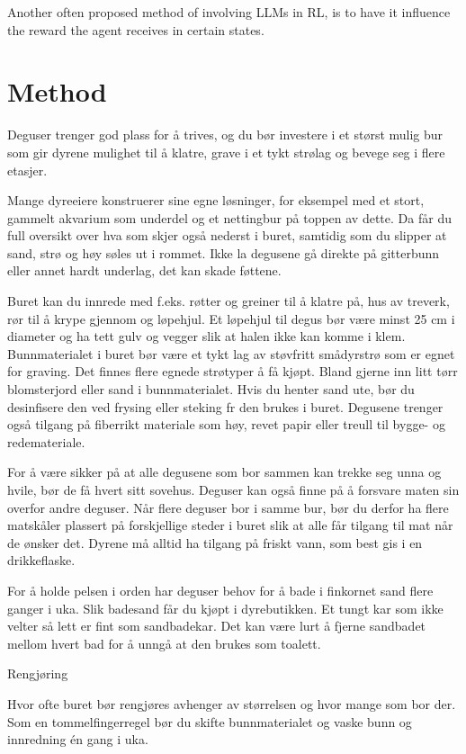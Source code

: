 \documentclass[conference]{IEEEtran}
\begin{document}
Another often proposed method of involving LLMs in RL, is to have it influence the reward the agent receives in certain states. \cite{ellm} 

\section{Method}

Deguser trenger god plass for å trives, og du bør investere i et størst mulig bur som gir dyrene mulighet til å klatre, grave i et tykt strølag og bevege seg i flere etasjer.

Mange dyreeiere konstruerer sine egne løsninger, for eksempel med et stort, gammelt akvarium som underdel og et nettingbur på toppen av dette. Da får du full oversikt over hva som skjer også nederst i buret, samtidig som du slipper at sand, strø og høy søles ut i rommet. Ikke la degusene gå direkte på gitterbunn eller annet hardt underlag, det kan skade føttene.

Buret kan du innrede med f.eks. røtter og greiner til å klatre på, hus av treverk, rør til å krype gjennom og løpehjul. Et løpehjul til degus bør være minst 25 cm i diameter og ha tett gulv og vegger slik at halen ikke kan komme i klem. Bunnmaterialet i buret bør være et tykt lag av støvfritt smådyrstrø som er egnet for graving. Det finnes flere egnede strøtyper å få kjøpt. Bland gjerne inn litt tørr blomsterjord eller sand i bunnmaterialet. Hvis du henter sand ute, bør du desinfisere den ved frysing eller steking fr den brukes i buret. Degusene trenger også tilgang på fiberrikt materiale som høy, revet papir eller treull til bygge- og redemateriale.

For å være sikker på at alle degusene som bor sammen kan trekke seg unna og hvile, bør de få hvert sitt sovehus. Deguser kan også finne på å forsvare maten sin overfor andre deguser. Når flere deguser bor i samme bur, bør du derfor ha flere matskåler plassert på forskjellige steder i buret slik at alle får tilgang til mat når de ønsker det. Dyrene må alltid ha tilgang på friskt vann, som best gis i en drikkeflaske.

For å holde pelsen i orden har deguser behov for å bade i finkornet sand flere ganger i uka. Slik badesand får du kjøpt i dyrebutikken. Et tungt kar som ikke velter så lett er fint som sandbadekar. Det kan være lurt å fjerne sandbadet mellom hvert bad for å unngå at den brukes som toalett.

Rengjøring

Hvor ofte buret bør rengjøres avhenger av størrelsen og hvor mange som bor der. Som en tommelfingerregel bør du skifte bunnmaterialet og vaske bunn og innredning én gang i uka. 
\end{document}
